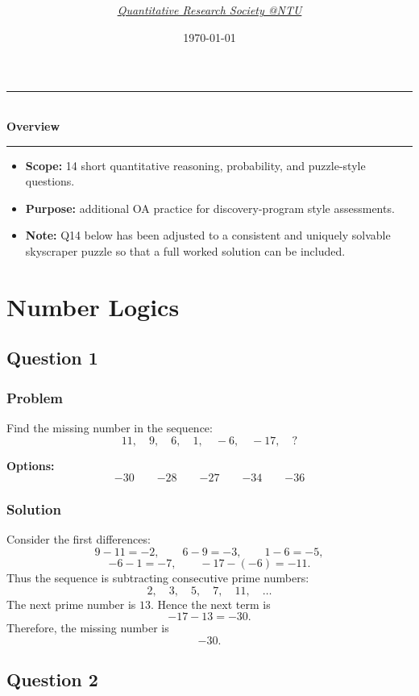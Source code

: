 \documentclass[12pt]{article}
\title{
\Huge \CourseCode\ \CourseName \\[0.3em]
\Large \DocType \\[0.3em]
\ExamMeta
}
\author{
  \textit{\href{https://qrsntu.org}{Quantitative Research Society @NTU}}
}
\date{\today}
\newenvironment{overview}{
  \par\bigskip
  \begin{center}
    \rule{0.92\linewidth}{0.6pt}\\[-0.2em]
    \textbf{Overview}\\[-0.2em]
    \rule{0.92\linewidth}{0.6pt}
  \end{center}
  \vspace{-0.3em}
  \begin{itemize}[leftmargin=1.6em, itemsep=0.2em, topsep=0.2em]
}{
  \end{itemize}
  \par\bigskip
}
\begin{document}
\maketitle
\thispagestyle{plainfirst}
\pagestyle{main}

\begin{overview}
  \item \textbf{Scope:} 14 short quantitative reasoning, probability, and puzzle-style questions.
  \item \textbf{Purpose:} additional OA practice for discovery-program style assessments.
  \item \textbf{Note:} Q14 below has been adjusted to a consistent and uniquely solvable skyscraper puzzle so that a full worked solution can be included.
\end{overview}

\newpage
\tableofcontents
\newpage

\section{Number Logics}

\subsection{Question 1}
\subsubsection{Problem}
Find the missing number in the sequence:
\[
11,\quad 9,\quad 6,\quad 1,\quad -6,\quad -17,\quad ?
\]

\noindent\textbf{Options:}
\[
\boxed{-30}
\qquad
\boxed{-28}
\qquad
\boxed{-27}
\qquad
\boxed{-34}
\qquad
\boxed{-36}
\]

\subsubsection{Solution}
Consider the first differences:
\[
9-11=-2,\qquad 6-9=-3,\qquad 1-6=-5,
\]
\[
-6-1=-7,\qquad -17-(-6)=-11.
\]
Thus the sequence is subtracting consecutive prime numbers:
\[
2,\quad 3,\quad 5,\quad 7,\quad 11,\quad \ldots
\]
The next prime number is \(13\). Hence the next term is
\[
-17-13=-30.
\]
Therefore, the missing number is
\[
\boxed{-30}.
\]

\subsection{Question 2}
\end{document}
